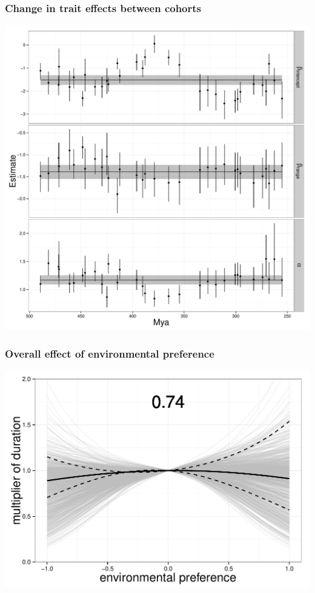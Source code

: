 \documentclass{beamer}
\begin{document}
\begin{frame}
  \frametitle{Change in trait effects between cohorts}

  \begin{center}
    \includegraphics[width = \textwidth,height = 0.8\textheight,keepaspectratio = true]{figure/cohort_series}
  \end{center}
\end{frame}

\begin{frame}
  \frametitle{Overall effect of environmental preference}

  \includegraphics[width = \textwidth,height = 0.8\textheight,keepaspectratio = true]{figure/environ_quad}
\end{frame}
\end{document}
